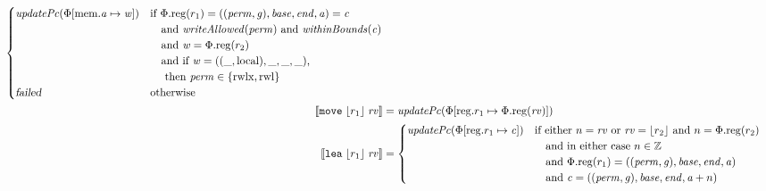 \documentclass[a4paper]{article}
\newcommand{\update}[2]{[#1 \mapsto #2]}
\newcommand{\sem}[1]{\left\llbracket #1 \right\rrbracket}
\newcommand{\var}[1]{\mathit{#1}}
\newcommand{\rv}{\var{rv}}
\newcommand{\gl}{\var{g}}
\newcommand{\addr}{\var{a}}
\newcommand{\start}{\var{base}}
\newcommand{\addrend}{\var{end}}
\newcommand{\perm}{\var{perm}}
\newcommand{\stdcap}[1][(\perm,\gl)]{\left(#1,\start,\addrend,\addr \right)}
\newcommand{\plainproj}[1]{\mathrm{#1}}
\newcommand{\memreg}[1][\Phi]{#1.\plainproj{reg}}
\newcommand{\updateHeap}[3][\Phi]{#1\update{\plainproj{mem}.#2}{#3}}
\newcommand{\updateReg}[3][\Phi]{#1\update{\plainproj{reg}.#2}{#3}}
\newcommand{\failed}{\textsl{failed}}
\newcommand{\plainfun}[2]{
  \ifthenelse{\equal{#2}{}}
             {\mathit{#1}}
             {\mathit{#1}(#2)}
}
\newcommand{\writeAllowed}[1]{\plainfun{writeAllowed}{#1}}
\newcommand{\withinBounds}[1]{\plainfun{withinBounds}{#1}}
\newcommand{\stdUpdatePc}[1]{\plainfun{updatePc}{#1}}
\newcommand{\ints}{\mathbb{Z}}
\newcommand{\refreg}[1]{\lfloor #1 \rfloor}
\newcommand{\zinstr}[1]{\mathtt{#1}}
\newcommand{\twoinstr}[3]{\zinstr{#1} \; #2 \; #3}
\newcommand{\move}[2]{\twoinstr{move}{#1}{#2}}
\newcommand{\lea}[2]{\twoinstr{lea}{#1}{#2}}
\newcommand{\plainperm}[1]{\mathrm{#1}}
\newcommand{\readwritel}{\plainperm{rwl}}
\newcommand{\rwlx}{\plainperm{rwlx}}
\newcommand{\local}{\plainperm{local}}
\begin{document}
\begin{align*}
                                             \begin{cases}
                                               \stdUpdatePc{\updateHeap{\addr}{\var{w}}} &
                                               \arraycolsep=0pt
                                               \begin{array}[t]{l}
                                                 \text{if }\memreg(r_1) = \stdcap = \var{c} \\
                                                 \quad\text{and }\writeAllowed{\perm} \text{ and } \withinBounds{\var{c}} \\
                                                 \quad\text{and }\var{w} = \memreg(r_2)\\
                                                 \quad\text{and if } \var{w} = ((\_,\local),\_,\_,\_) \text{,} \\
                                                 \quad\text{ then } \perm \in \{\rwlx,\readwritel \}
                                               \end{array}\\
                                               \failed & \text{otherwise }
                                             \end{cases}\\
 \sem{\move{\refreg{r_1}}{\rv}}            & = \stdUpdatePc{\updateReg{r_1}{\memreg(\rv)}}
\\
  \sem{\lea{\refreg{r_1}}{\rv}}            & =
                                             \begin{cases}
                                               \stdUpdatePc{\updateReg{r_1}{\var{c}}} &
                                                 \arraycolsep=0pt
                                                 \begin{array}[t]{l}
                                                   \text{if either $n = \rv$ or $\rv = \refreg{r_2}$ and $n = \memreg(r_2)$} \\
                                                   \quad\text{and in either case $n \in \ints $} \\
                                                   \quad\text{and $\memreg(r_1) = \stdcap$}\\
                                                   \quad\text{and $\var{c} = ((\perm,\gl),\start,\addrend,\addr + n)$}
                                                 \end{array}\\

\end{cases}
\end{align*}
\end{document}
